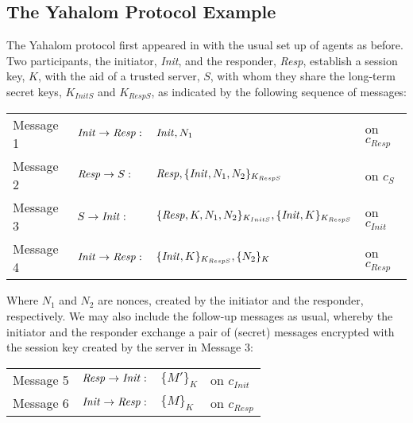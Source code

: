 \documentclass[10pt,a4paper,final,oneside,fleqn]{book}
\begin{document}
\subsection{The Yahalom Protocol Example \label{sect:anyahalom}}
The Yahalom protocol first appeared in \cite{burrows1} with the usual set up of agents as before.  Two participants, the initiator, {\itshape Init\/}, and the responder, {\itshape Resp\/}, establish a session key, $K$, with the aid of a trusted server, $S$, with whom they share the long-term secret keys, $K_{InitS}$ and $K_{RespS}$, as indicated by the following sequence of messages:\vspace{5mm}

\begin{tabular}{llll}
Message 1&\hspace{5mm}$\mbox{{\itshape Init\/}}\to\mbox{{\itshape Resp\/}}:$&$\mbox{{\itshape Init\/}},N_1$&on $c_{Resp}$\\
Message 2&\hspace{5mm}$\mbox{{\itshape Resp\/}}\to S:$&$ \mbox{{\itshape Resp\/}},\{\mbox{{\itshape Init\/}},N_1,N_2\}_{K_{RespS}}$&on $c_{S}$\\
Message 3&\hspace{5mm}$S\to\mbox{{\itshape Init\/}}:$&$\{\mbox{{\itshape Resp\/}},K,N_1,N_2\}_{K_{InitS}},\{\mbox{{\itshape Init\/}},K\}_{K_{RespS}}$&on $c_{Init}$\\
Message 4&\hspace{5mm}$\mbox{{\itshape Init\/}}\to\mbox{{\itshape Resp\/}}:$&$\{\mbox{{\itshape Init\/}},K\}_{K_{RespS}},\{N_2\}_{K}$&on $c_{Resp}$
\end{tabular}\vspace{5mm}

\noindent
Where $N_1$ and $N_2$ are nonces, created by the initiator and the responder, respectively.  We may also include the follow-up messages as usual, whereby the initiator and the responder exchange a pair of (secret) messages encrypted with the session key created by the server in Message 3:\vspace{5mm}

\begin{tabular}{llll}
Message 5&\hspace{5mm}$\mbox{{\itshape Resp\/}}\to\mbox{{\itshape Init\/}}:$&$\{M'\}_{K}$&on $c_{Init}$\\
Message 6&\hspace{5mm}$\mbox{{\itshape Init\/}}\to\mbox{{\itshape Resp\/}}:$&$\{M\}_{K}$&on $c_{Resp}$
\end{tabular}\vspace{5mm}
\end{document}
